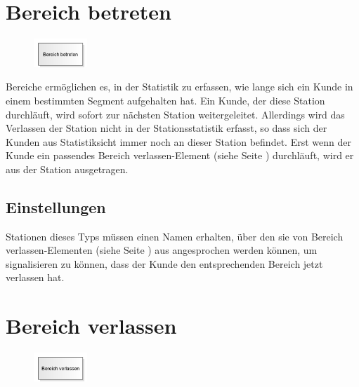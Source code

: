 \section{Bereich betreten}
\label{ref:ModelElementSectionStart}

\begin{figure}
\vspace{-22pt}
\includegraphics[width=2cm]{imageModelElementSectionStart.png}
\vspace{-22pt}
\end{figure}

Bereiche ermöglichen es, in der Statistik zu erfassen, wie lange sich ein Kunde in einem bestimmten
Segment aufgehalten hat. Ein Kunde, der diese Station durchläuft, wird sofort zur nächsten Station
weitergeleitet. Allerdings wird das Verlassen der Station nicht in der Stationsstatistik erfasst,
so dass sich der Kunden aus Statistiksicht immer noch an dieser Station befindet. Erst wenn der
Kunde ein passendes Bereich verlassen-Element (siehe Seite \pageref{ref:ModelElementSectionEnd}) durchläuft,
wird er aus der Station ausgetragen.

\subsection*{Einstellungen}

Stationen dieses Typs müssen einen Namen erhalten, über den sie von
Bereich verlassen-Elementen (siehe Seite \pageref{ref:ModelElementSectionEnd}) 
aus angesprochen werden können, um signalisieren zu können, dass der
Kunde den entsprechenden Bereich jetzt verlassen hat.


\section{Bereich verlassen}
\label{ref:ModelElementSectionEnd}

\begin{figure}
\vspace{-22pt}
\includegraphics[width=2cm]{imageModelElementSectionEnd.png}
\vspace{-22pt}
\end{figure}

